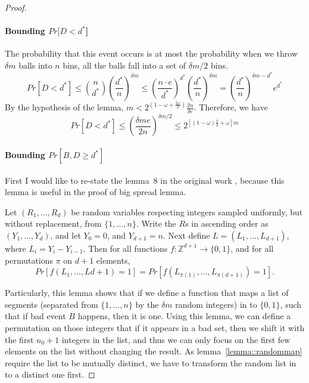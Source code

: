 \begin{proof}
  \paragraph{Bounding $Pr[D < d^*$]}
  The probability that this event occurs is at most the probability when we throw $\delta m$ balls into $n$ bins, all the balls fall into a set of
  $\delta m/2$ bins.
  \begin{equation}
    Pr[D < d^*] \leq \binom{n}{d^*}(\frac{d^*}{n})^{\delta m} \leq (\frac{n \cdot e}{d^*})^{d^*}(\frac{d^*}{n})^{\delta m} = (\frac{d^*}{n})^{\delta m - d^*}e^{d^*}
  \end{equation}
  By the hypothesis of the lemma, $m < 2^{(1-\omega + \frac{2\omega}{\delta})}\frac{2n}{\delta e}$. Therefore, we have
  \begin{equation}
    Pr[D < d^*] \leq (\frac{\delta me}{2n})^{\delta m/2} \leq 2^{[(1-\omega)\frac{\delta}{2}+\omega]m}
  \end{equation}

  \paragraph{Bounding $Pr[B, D \geq d^*]$}
  First I would like to re-state the lemma~8 in the original work \cite{corrigan2016balloon}, because this lemma is useful in the proof of big spread lemma.
  \begin{lemma}\label{lemma::randommap}
    Let $(R_1,\dots,R_d)$ be random variables respecting integers sampled uniformly, but without replacement, from $\{1,\dots,n\}$. Write the $R$s in ascending
    order as $(Y_1,\dots,Y_d)$, and let $Y_0 = 0$, and $Y_{d+1} = n$. Next define $L = (L_1,\dots,L_{d+1})$, where $L_i = Y_i - Y_{i-1}$. Then for all functions
    $f:\mathbb{Z}^{d+1} \rightarrow \{0,1\}$, and for all permutations $\pi$ on $d+1$ elements,
    \begin{equation}
      Pr[f(L_1,\dots,L{d+1}) = 1] = Pr[f(L_{\pi(1)},\dots,L_{\pi(d+1)}) = 1].
    \end{equation}
  \end{lemma}

  Particularly, this lemma shows that if we define a function that maps a list of segments (separated from $\{1,\dots,n\}$ by the $\delta m$ random integers)
  in to $\{0,1\}$, such that
  if bad event $B$ happens, then it is one. Using this lemma, we can define a permutation on those integers that if it appears in a bad set, then we shift it with
  the first $n_0+1$ integers in the list, and thus we can only focus on the first few elements on the list without changing the result. As lemma~\ref{lemma::randommap}
  require the list to be mutually distinct, we have to transform the random list in to a distinct one first.


\end{proof}
